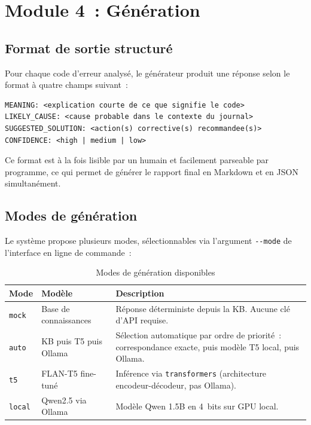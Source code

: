 \documentclass[12pt,a4paper]{report}
\begin{document}
\section{Module 4~: G\'en\'eration}

\subsection{Format de sortie structur\'e}

Pour chaque code d'erreur analys\'e, le g\'en\'erateur produit une r\'eponse selon
le format \`a quatre champs suivant~:

\begin{lstlisting}[language={},caption={Format de r\'eponse structur\'e du g\'en\'erateur},label=lst:format]
MEANING: <explication courte de ce que signifie le code>
LIKELY_CAUSE: <cause probable dans le contexte du journal>
SUGGESTED_SOLUTION: <action(s) corrective(s) recommandee(s)>
CONFIDENCE: <high | medium | low>
\end{lstlisting}

Ce format est \`a la fois lisible par un humain et facilement parseable par programme,
ce qui permet de g\'en\'erer le rapport final en Markdown et en JSON simultan\'ement.

\subsection{Modes de g\'en\'eration}

Le syst\`eme propose plusieurs modes, s\'electionnables via l'argument
\texttt{-{}-mode} de l'interface en ligne de commande~:

\begin{table}[H]
  \centering
  \caption{Modes de g\'en\'eration disponibles}
  \label{tab:modes}
  \begin{tabularx}{\textwidth}{llX}
    \toprule
    \textbf{Mode} & \textbf{Mod\`ele} & \textbf{Description} \\
    \midrule
    \texttt{mock}  & Base de connaissances & R\'eponse d\'eterministe depuis la KB.
                                             Aucune cl\'e d'API requise.\\[0.2cm]
    \texttt{auto}  & KB puis T5 puis Ollama & S\'election automatique par ordre de
                                              priorit\'e~: correspondance exacte, puis
                                              mod\`ele T5 local, puis Ollama.\\[0.2cm]
    \texttt{t5}    & FLAN-T5 fine-tun\'e & Inf\'erence via \texttt{transformers}
                                          (architecture encodeur-d\'ecodeur,
                                          pas Ollama).\\[0.2cm]
    \texttt{local} & Qwen2.5 via Ollama & Mod\`ele Qwen 1.5B en 4~bits sur GPU local.\\
    \bottomrule
  \end{tabularx}
\end{table}
\end{document}
